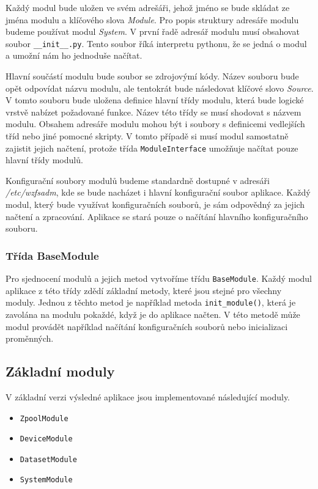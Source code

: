     Každý modul bude uložen ve svém adrešáři, jehož jméno se bude skládat ze jména modulu a klíčového slova \emph{Module}. Pro popis struktury adresáře modulu budeme používat modul \emph{System}. V první řadě adresář modulu musí obsahovat soubor \verb|__init__.py|. Tento soubor říká interpretu pythonu, že se jedná o modul a umožní nám ho jednoduše načítat.

    Hlavní součástí modulu bude soubor se zdrojovýmí kódy. Název souboru bude opět odpovídat názvu modulu, ale tentokrát bude následovat klíčové slovo \emph{Source}.
    V tomto souboru bude uložena definice hlavní třídy modulu, která bude logické vrstvě nabízet požadované funkce. Název této třídy se musí shodovat s názvem modulu. Obsahem adresáře modulu mohou být i soubory s definicemi vedlejších tříd nebo jiné pomocné skripty. V tomto případě si musí modul samostatně zajistit jejich načtení, protože třída \verb|ModuleInterface| umožňuje načítat pouze hlavní třídy modulů.

    Konfigurační soubory modulů budeme standardně dostupné v adresáři \emph{/etc/wzfsadm}, kde se bude nacházet i hlavní konfigurační soubor aplikace. Každý modul, který bude využívat konfiguračních souborů, je sám odpovědný za jejich načtení a zpracování. Aplikace se stará pouze o načítání hlavního konfiguračního souboru.

    \subsubsection{Třída BaseModule}
    Pro sjednocení modulů a jejich metod vytvoříme třídu \verb|BaseModule|. Každý modul aplikace z této třídy zdědí základní metody, které jsou stejné pro všechny moduly.
    Jednou z těchto metod je například metoda \verb|init_module()|, která je zavolána na modulu pokaždé, když je do aplikace načten. V této metodě může modul provádět například načítání konfiguračních souborů nebo inicializaci proměnných.

    \subsection{Základní moduly}
    V základní verzi výsledné aplikace jsou implementované následující moduly.
    \begin{itemize}
      \item \verb|ZpoolModule|
      \item \verb|DeviceModule|
      \item \verb|DatasetModule|
      \item \verb|SystemModule|
    \end{itemize}

